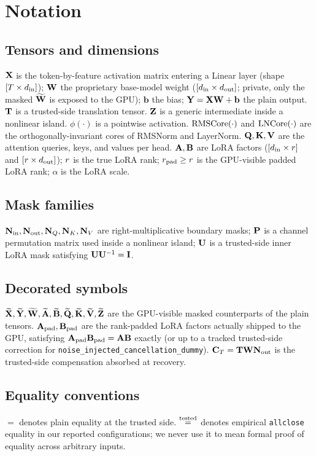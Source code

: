\section{Notation}
\label{app:notation}

\subsection*{Tensors and dimensions}
$\mathbf{X}$ is the token-by-feature activation matrix entering a Linear layer (shape $[T \times d_{\mathrm{in}}]$); $\mathbf{W}$ the proprietary base-model weight ($[d_{\mathrm{in}} \times d_{\mathrm{out}}]$; private, only the masked $\widetilde{\mathbf{W}}$ is exposed to the GPU); $\mathbf{b}$ the bias; $\mathbf{Y} = \mathbf{X}\mathbf{W} + \mathbf{b}$ the plain output. $\mathbf{T}$ is a trusted-side translation tensor. $\mathbf{Z}$ is a generic intermediate inside a nonlinear island. $\phi(\cdot)$ is a pointwise activation. $\mathrm{RMSCore}(\cdot)$ and $\mathrm{LNCore}(\cdot)$ are the orthogonally-invariant cores of RMSNorm and LayerNorm. $\mathbf{Q}, \mathbf{K}, \mathbf{V}$ are the attention queries, keys, and values per head. $\mathbf{A}, \mathbf{B}$ are LoRA factors ($[d_{\mathrm{in}} \times r]$ and $[r \times d_{\mathrm{out}}]$); $r$ is the true LoRA rank; $r_{\mathrm{pad}} \geq r$ is the GPU-visible padded LoRA rank; $\alpha$ is the LoRA scale.

\subsection*{Mask families}
$\mathbf{N}_{\mathrm{in}}, \mathbf{N}_{\mathrm{out}}, \mathbf{N}_{Q}, \mathbf{N}_{K}, \mathbf{N}_{V}$ are right-multiplicative boundary masks; $\mathbf{P}$ is a channel permutation matrix used inside a nonlinear island; $\mathbf{U}$ is a trusted-side inner LoRA mask satisfying $\mathbf{U}\mathbf{U}^{-1} = \mathbf{I}$.

\subsection*{Decorated symbols}
$\widetilde{\mathbf{X}}, \widetilde{\mathbf{Y}}, \widetilde{\mathbf{W}}, \widetilde{\mathbf{A}}, \widetilde{\mathbf{B}}, \widetilde{\mathbf{Q}}, \widetilde{\mathbf{K}}, \widetilde{\mathbf{V}}, \widetilde{\mathbf{Z}}$ are the GPU-visible masked counterparts of the plain tensors. $\mathbf{A}_{\mathrm{pad}}, \mathbf{B}_{\mathrm{pad}}$ are the rank-padded LoRA factors actually shipped to the GPU, satisfying $\mathbf{A}_{\mathrm{pad}}\mathbf{B}_{\mathrm{pad}} = \mathbf{A}\mathbf{B}$ exactly (or up to a tracked trusted-side correction for \texttt{noise\_injected\_cancellation\_dummy}). $\mathbf{C}_{T} = \mathbf{T}\mathbf{W}\mathbf{N}_{\mathrm{out}}$ is the trusted-side compensation absorbed at recovery.

\subsection*{Equality conventions}
$=$ denotes plain equality at the trusted side. $\stackrel{\text{tested}}{=}$ denotes empirical \texttt{allclose} equality in our reported configurations; we never use it to mean formal proof of equality across arbitrary inputs.

